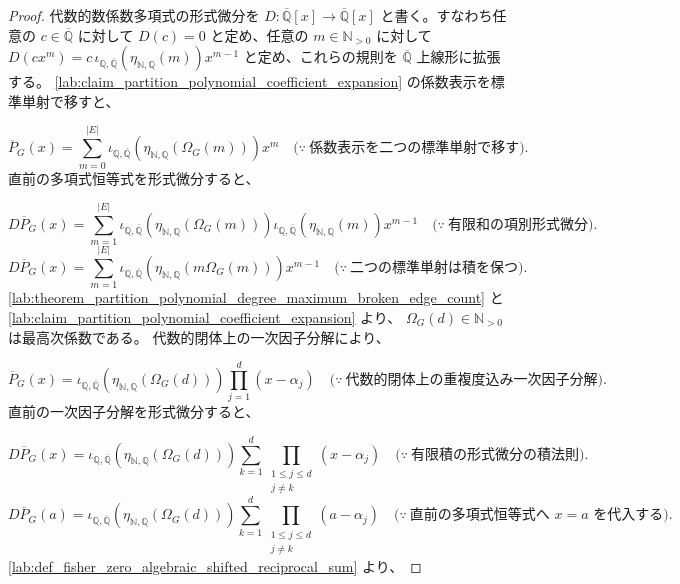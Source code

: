 \documentclass[11pt,a4paper]{article}
\theoremstyle{remark}
\begin{document}
\begin{proof}
代数的数係数多項式の形式微分を
$D:\overline{\mathbb Q}[x]\to\overline{\mathbb Q}[x]$
 と書く。すなわち任意の
$c\in\overline{\mathbb Q}$
 に対して
$D(c)=0$
 と定め、任意の
$m\in\mathbb N_{>0}$
 に対して
$D(cx^m)=c\,\iota_{\mathbb Q,\overline{\mathbb Q}}\!\left(\eta_{\mathbb N,\mathbb Q}(m)\right)x^{m-1}$
 と定め、これらの規則を
$\overline{\mathbb Q}$
 上線形に拡張する。
\cref{lab:claim_partition_polynomial_coefficient_expansion}
 の係数表示を標準単射で移すと、

\[\overline P_G(x)
=
\sum_{m=0}^{|E|}
\iota_{\mathbb Q,\overline{\mathbb Q}}\!\left(
  \eta_{\mathbb N,\mathbb Q}\!\left(\Omega_G(m)\right)
\right)
x^m
\quad\bigl(\because\ \text{係数表示を二つの標準単射で移す}\bigr).\]
直前の多項式恒等式を形式微分すると、

\[D\overline P_G(x)
=
\sum_{m=1}^{|E|}
\iota_{\mathbb Q,\overline{\mathbb Q}}\!\left(
  \eta_{\mathbb N,\mathbb Q}\!\left(\Omega_G(m)\right)
\right)
\iota_{\mathbb Q,\overline{\mathbb Q}}\!\left(
  \eta_{\mathbb N,\mathbb Q}(m)
\right)
x^{m-1}
\quad\bigl(\because\ \text{有限和の項別形式微分}\bigr).\]
\[D\overline P_G(x)
=
\sum_{m=1}^{|E|}
\iota_{\mathbb Q,\overline{\mathbb Q}}\!\left(
  \eta_{\mathbb N,\mathbb Q}\!\left(m\Omega_G(m)\right)
\right)
x^{m-1}
\quad\bigl(\because\ \text{二つの標準単射は積を保つ}\bigr).\]
\cref{lab:theorem_partition_polynomial_degree_maximum_broken_edge_count}
 と
\cref{lab:claim_partition_polynomial_coefficient_expansion}
 より、
$\Omega_G(d)\in\mathbb N_{>0}$
 は最高次係数である。
代数的閉体上の一次因子分解により、

\[\overline P_G(x)
=
\iota_{\mathbb Q,\overline{\mathbb Q}}\!\left(
  \eta_{\mathbb N,\mathbb Q}(\Omega_G(d))
\right)
\prod_{j=1}^{d}(x-\alpha_j)
\quad\bigl(\because\ \text{代数的閉体上の重複度込み一次因子分解}\bigr).\]
直前の一次因子分解を形式微分すると、

\[D\overline P_G(x)
=
\iota_{\mathbb Q,\overline{\mathbb Q}}\!\left(
  \eta_{\mathbb N,\mathbb Q}(\Omega_G(d))
\right)
\sum_{k=1}^{d}
\prod_{\substack{1\le j\le d\\j\ne k}}(x-\alpha_j)
\quad\bigl(\because\ \text{有限積の形式微分の積法則}\bigr).\]
\[D\overline P_G(a)
=
\iota_{\mathbb Q,\overline{\mathbb Q}}\!\left(
  \eta_{\mathbb N,\mathbb Q}(\Omega_G(d))
\right)
\sum_{k=1}^{d}
\prod_{\substack{1\le j\le d\\j\ne k}}(a-\alpha_j)
\quad\bigl(\because\ \text{直前の多項式恒等式へ }x=a\text{ を代入する}\bigr).\]
\cref{lab:def_fisher_zero_algebraic_shifted_reciprocal_sum}
 より、


\end{proof}
\end{document}
